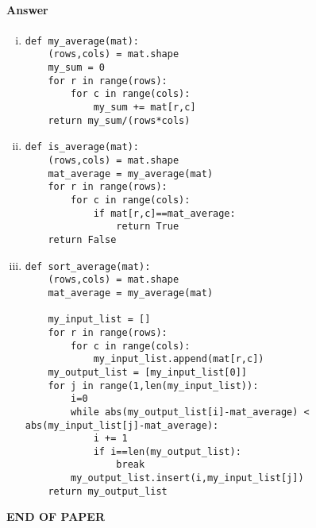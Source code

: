 \documentclass[12pt]{article}
\begin{document}
\paragraph{Answer}
\begin{enumerate}[(i)]
\item \begin{verbatim}
def my_average(mat):
    (rows,cols) = mat.shape
    my_sum = 0
    for r in range(rows):
        for c in range(cols):
            my_sum += mat[r,c]
    return my_sum/(rows*cols)
\end{verbatim}
\item \begin{verbatim}
def is_average(mat):
    (rows,cols) = mat.shape
    mat_average = my_average(mat)
    for r in range(rows):
        for c in range(cols):
            if mat[r,c]==mat_average:
                return True
    return False
\end{verbatim}
\item \begin{verbatim}
def sort_average(mat):
    (rows,cols) = mat.shape
    mat_average = my_average(mat)
    
    my_input_list = []
    for r in range(rows):
        for c in range(cols):
            my_input_list.append(mat[r,c])
    my_output_list = [my_input_list[0]]
    for j in range(1,len(my_input_list)):
        i=0
        while abs(my_output_list[i]-mat_average) < abs(my_input_list[j]-mat_average):
            i += 1
            if i==len(my_output_list):
                break
        my_output_list.insert(i,my_input_list[j])
    return my_output_list
\end{verbatim}
\end{enumerate}
\bigskip
\vfill
\begin{center}{\bf END OF PAPER}\end{center}
\end{document}
